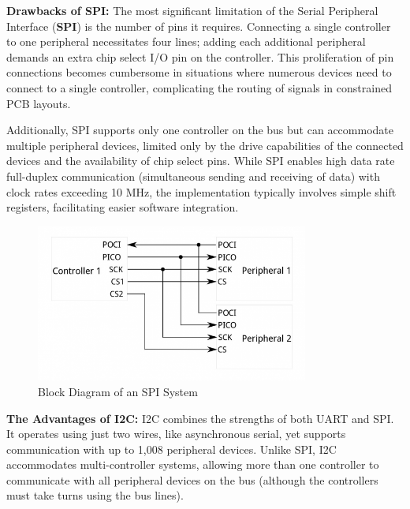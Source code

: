 \documentclass[a4paper,12pt]{report}
\begin{document}
\newpage

\textbf{Drawbacks of SPI:}  
The most significant limitation of the Serial Peripheral Interface (\textbf{SPI}) is the number of pins it requires. Connecting a single controller to one peripheral necessitates four lines; adding each additional peripheral demands an extra chip select I/O pin on the controller. This proliferation of pin connections becomes cumbersome in situations where numerous devices need to connect to a single controller, complicating the routing of signals in constrained PCB layouts. 

\vspace{0.25in}

Additionally, SPI supports only one controller on the bus but can accommodate multiple peripheral devices, limited only by the drive capabilities of the connected devices and the availability of chip select pins. While SPI enables high data rate full-duplex communication (simultaneous sending and receiving of data) with clock rates exceeding 10 MHz, the implementation typically involves simple shift registers, facilitating easier software integration.

\begin{figure}[htbp]
    \centering
    \includegraphics[width=0.8\textwidth]{spi_block_diagram.png} %
    \caption{Block Diagram of an SPI System}
    \label{fig:spi_block_diagram}
\end{figure}

\newpage

\textbf{The Advantages of I2C:}  
I2C combines the strengths of both UART and SPI. It operates using just two wires, like asynchronous serial, yet supports communication with up to 1,008 peripheral devices. Unlike SPI, I2C accommodates multi-controller systems, allowing more than one controller to communicate with all peripheral devices on the bus (although the controllers must take turns using the bus lines). 
\end{document}
